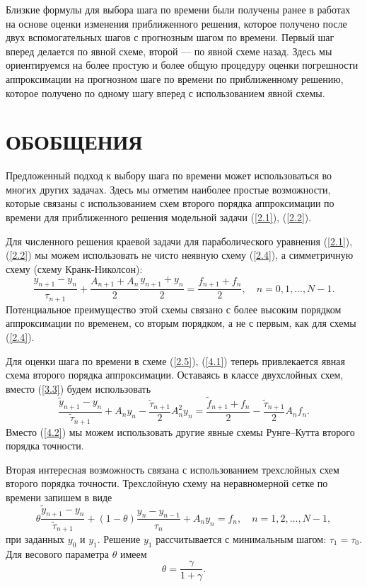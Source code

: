 \documentclass[12pt]{ncc}
\numberwithin{equation}{section}
\begin{document}
Близкие формулы для выбора шага по времени были получены ранее
в работах \cite{vabishchevich2015priori,vabishchevich2015time} на
основе оценки изменения приближенного решения, которое
получено после двух вспомогательных шагов с прогнозным шагом по времени.
Первый шаг вперед делается по явной схеме, второй --- по явной схеме назад.
Здесь мы ориентируемся на более простую и более общую процедуру оценки погрешности
аппроксимации на прогнозном шаге по времени по приближенному решению, которое
получено по одному шагу вперед с использованием явной схемы.

\section{ОБОБЩЕНИЯ} 

Предложенный подход к выбору шага по времени может использоваться
во многих других задачах. Здесь мы отметим наиболее простые возможности,
которые связаны с использованием схем второго порядка аппроксимации по времени для
приближенного решения модельной задачи (\ref{2.1}), (\ref{2.2}).

Для численного решения краевой задачи для параболического уравнения
(\ref{2.1}), (\ref{2.2}) мы можем использовать не чисто неявную схему (\ref{2.4}),
а симметричную схему (схему Кранк-Николсон):
\begin{equation}\label{4.1}
  \frac{y_{n+1} - y_{n}}{\tau_{n+1}} + \frac{ A_{n+1}+A_n}{2} \frac{ y_{n+1}+y_n}{2} = \frac{f_{n+1}+f_n}{2},
  \quad n = 0,1, ..., N-1 . 
\end{equation}
Потенциальное преимущество этой схемы связано с более высоким порядком
аппроксимации по временем, со вторым порядком, а не с первым, как для схемы 
(\ref{2.4}).

Для оценки шага по времени в схеме (\ref{2.5}), (\ref{4.1}) теперь привлекается 
явная схема второго порядка аппроксимации.
Оставаясь в классе двухслойных схем, вместо (\ref{3.3}) будем использовать
\begin{equation}\label{4.2}
  \frac{\widetilde{y}_{n+1} - y_{n}}{\widetilde{\tau}_{n+1}} +  A_n y_{n} 
  - \frac{\widetilde{\tau}_{n+1}}{2} A_{n}^2 y_{n} = 
   \frac{ \widetilde{f}_{n+1}+f_n}{2} - \frac{\widetilde{\tau}_{n+1}}{2} A_{n} f_{n} .
\end{equation} 
Вместо (\ref{4.2}) мы можем использовать другие явные схемы Рунге--Кутта
второго порядка точности.

Вторая интересная возможность связана с использованием трехслойных схем второго порядка точности.
Трехслойную схему на неравномерной сетке по времени запишем в виде
\begin{equation}\label{4.3}
  \theta \frac{\widetilde{y}_{n+1} - y_{n}}{\widetilde{\tau}_{n+1}} +  
  (1-\theta) \frac{y_{n} - y_{n-1}}{\tau_{n}} + A_{n} y_{n} = f_{n},
  \quad n = 1,2, ..., N-1 , 
\end{equation}
при заданных $y_0$ и $y_1$. Решение $y_1$ рассчитывается с минимальным шагом: $\tau_1 = \tau_0$.
Для весового параметра $\theta$ имеем
\[
 \theta = \frac{\gamma }{1 + \gamma } .
\] 
\end{document}

